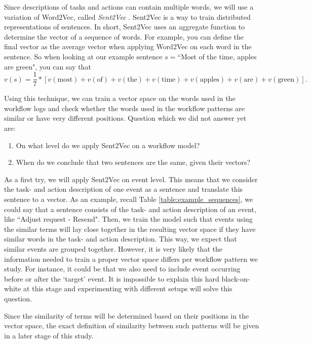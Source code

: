 \documentclass[a4paper,11pt]{article}
\begin{document}
Since descriptions of tasks and actions can contain multiple words, we will use a variation of Word2Vec, called \textit{Sent2Vec} \cite{Sent2Vec}. Sent2Vec is a way to train distributed representations of sentences. In short, Sent2Vec uses an aggregate function to determine the vector of a sequence of words. For example, you can define the final vector as the average vector when applying Word2Vec on each word in the sentence. So when looking at our example sentence $s=$``Most of the time, apples are green", you can say that 
\begin{equation}
v(s)= \frac{1}{7} * [v(\text{most})+v(\text{of})+v(\text{the})+v(\text{time})+v(\text{apples})+v(\text{are})+v(\text{green})].
\end{equation}

Using this technique, we can train a vector space on the words used in the workflow logs and check whether the words used in the workflow patterns are similar or have very different positions. Question which we did not answer yet are:

\begin{enumerate}
\item On what level do we apply Sent2Vec on a workflow model?
\item When do we conclude that two sentences are the same, given their vectors?
\end{enumerate}

As a first try, we will apply Sent2Vec on event level. This means that we consider the task- and action description of one event as a sentence and translate this sentence to a vector. As an example, recall Table \ref{table:example_sequences}, we could say that a sentence consists of the task- and action description of an event, like ``Adjust request - Resend". Then, we train the model such that events using the similar terms will lay close together in the resulting vector space if they have similar words in the task- and action description. This way, we expect that similar events are grouped together. However, it is very likely that the information needed to train a proper vector space differs per workflow pattern we study. For instance, it could be that we also need to include event occurring before or after the `target' event. It is impossible to explain this hard black-on-white at this stage and experimenting with different setups will solve this question.

Since the similarity of terms will be determined based on their positions in the vector space, the exact definition of similarity between such patterns will be given in a later stage of this study.
\end{document}
